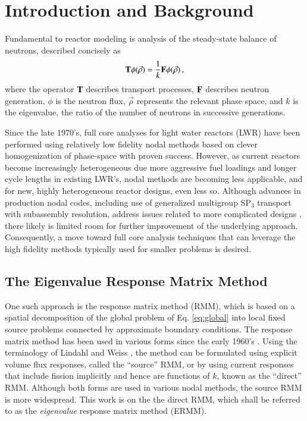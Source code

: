 \section{Introduction and Background}
\label{sec:litreview}

Fundamental to reactor modeling is analysis of the steady-state 
balance of neutrons, described concisely as
\begin{equation}
  \mathbf{T} \phi(\vec{\rho}) = \frac{1}{k} \mathbf{F} \phi(\vec{\rho}) \, ,
  \label{eq:global}
\end{equation}
where the operator $\mathbf{T}$ describes transport processes, $\mathbf{F}$ 
describes neutron generation, $\phi$ is the neutron flux, $\vec{\rho}$ 
represents the relevant phase space, and $k$ is the eigenvalue, the ratio 
of the number of neutrons in successive generations. 

Since the late 1970's, full core analyses for light water reactors 
(LWR) have been performed using relatively low fidelity nodal methods 
based on clever homogenization of phase-space with proven success.  
However, as current reactors become increasingly heterogeneous 
due more aggressive fuel loadings and longer 
cycle lengths in existing LWR's, nodal methods are becoming less applicable, 
and for new, highly heterogeneous reactor designs, even less so. Although 
advances in production nodal codes, including use of generalized multigroup 
SP$_3$ transport with subassembly resolution, address issues related
to more complicated designs \cite{bahadir2009sng}, there likely is limited 
room for further improvement of the underlying approach.
Consequently, a move toward full core analysis techniques that can 
leverage the high fidelity methods typically used for smaller problems 
is desired.  


\subsection{The Eigenvalue Response Matrix Method}

One such approach is the response matrix method (RMM), which is 
based on a spatial decomposition of the global problem of Eq. \ref{eq:global}
into local fixed source problems connected by approximate boundary
conditions.
The response matrix method has been used in various forms since 
the early 1960's \cite{shimizu1963arm}.  Using the terminology of 
Lindahl and Weiss \cite{lindahl1981rrm}, the method can be formulated 
using explicit volume flux responses, called the ``source'' RMM, or by 
using current responses that include fission implicitly and hence are 
functions of $k$, known as the ``direct'' RMM.  Although both forms are 
used in various nodal methods, the source RMM is more widespread. 
This work is on the the direct RMM, which shall be referred to as the 
{\it eigenvalue} response matrix method (ERMM).

